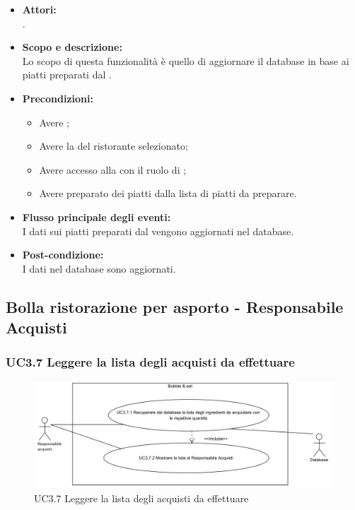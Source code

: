 \begin{itemize}
	\item \textbf{Attori:}
	\\.
	\item \textbf{Scopo e descrizione:} 
	\\Lo scopo di questa funzionalità è quello di aggiornare il database in base ai piatti preparati dal .
	\item \textbf{Precondizioni:}
	\begin{itemize}
		\item Avere ;
		\item Avere la  del ristorante selezionato;
		\item Avere accesso alla  con il ruolo di ;
		\item Avere preparato dei piatti dalla lista di piatti da preparare.
	\end{itemize}
	\item \textbf{Flusso principale degli eventi:}
	\\I dati sui piatti preparati dal  vengono aggiornati nel database.
	\item \textbf{Post-condizione:}
	\\I dati nel database sono aggiornati.
\end{itemize}

\subsection{Bolla ristorazione per asporto - Responsabile Acquisti}

\subsubsection{UC3.7 Leggere la lista degli acquisti da effettuare} \label{UC3.7}

\begin{figure}[H]
	\centering
	\includegraphics[width=15cm]{../../documenti/AnalisiDeiRequisiti/Diagrammi_img/uc3_7.png}
	\caption{UC3.7 Leggere la lista degli acquisti da effettuare}
\end{figure}

